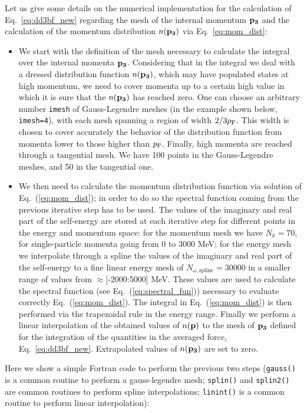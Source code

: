 Let us give some details on the numerical implementation for the calculation of Eq.~\eqref{eq:dd3bf_new} regarding the mesh of the internal momentum ${\bf p_3}$ and the calculation of the momentum distribution $n({\bf p_3})$ via Eq.~\eqref{eq:mom_dist}:
\begin{itemize}
\item We start with the definition of the mesh necessary to calculate the integral over the internal momenta ${\bf p_3}$. Considering that in the integral we deal with a dressed distribution function $n({\bf p_3})$, which may have populated states at high momentum, we need to cover momenta up to a certain high value in which it is sure that the $n({\bf p_3})$ has reached zero. One can choose an arbitrary number \verb|imesh| of Gauss-Legendre meshes (in the example shown below, \verb|imesh=4|), with each mesh spanning a region of width $2/3 p_{\rm F}$. This width is chosen to cover accurately the behavior of the distribution function from momenta lower to those higher than $p_\textrm F$. Finally, high momenta are reached through a tangential mesh. We have 100  points in the Gauss-Legendre meshes, and 50 in the tangential one. 
\item We then need to calculate the momentum distribution function via solution of Eq.~(\ref{eq:mom_dist}); in order to do so the spectral function coming from the previous iterative step has to be used. The values of the imaginary and real part of the self-energy are stored at each iterative step for different points in the energy and momentum space: for the momentum mesh we have $N_k=70$, for single-particle momenta going from 0 to 3000 MeV; for the energy mesh we interpolate through a spline the values of the imaginary and real part of the self-energy to a fine linear energy mesh of $N_{\omega,\textrm{spline}}=30000$ in a smaller range of values from $\approx$[-2000:5000] MeV. These values are used to calculate the spectral function (see Eq.~(\ref{eq:spectral_fun})) necessary to evaluate correctly Eq.~(\ref{eq:mom_dist}). The integral in Eq.~(\ref{eq:mom_dist}) is then performed via the trapezoidal rule in the energy range. Finally we perform a linear interpolation of the obtained values of $n({\bf p})$ to the mesh of ${\bf p_3}$ defined for the integration of the quantities in the averaged force, Eq.~\eqref{eq:dd3bf_new}. Extrapolated values of $n({\bf p_3})$ are set to zero.
\end{itemize}

\noindent
Here we show a simple Fortran code to perform the previous two steps (\verb|gauss()| is a common routine to perform a gauss-legendre mesh; \verb|splin()| and \verb|splin2()| are common routines to perform spline interpolations; \verb|linint()| is a common routine to perform linear interpolation):

